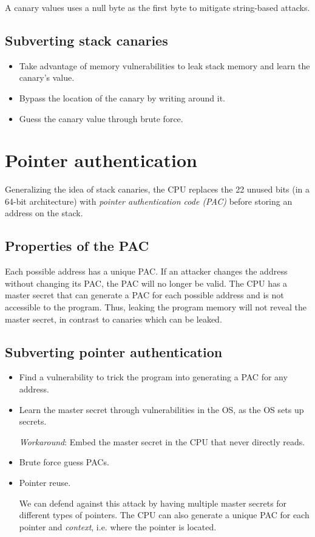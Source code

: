 A canary values uses a null byte as the first byte to mitigate string-based attacks.

\subsection{Subverting stack canaries}
\begin{itemize}
    \item Take advantage of memory vulnerabilities to leak stack memory and learn the canary's value.
    \item Bypass the location of the canary by writing around it.
    \item Guess the canary value through brute force.
\end{itemize}

\section{Pointer authentication}
Generalizing the idea of stack canaries, the CPU replaces the 22 unused bits (in a 64-bit architecture) with \emph{pointer authentication code (PAC)} before storing an address on the stack.

\subsection{Properties of the PAC}
Each possible address has a unique PAC. If an attacker changes the address without changing its PAC, the PAC will no longer be valid. The CPU has a master secret that can generate a PAC for each possible address and is not accessible to the program. Thus, leaking the program memory will not reveal the master secret, in contrast to canaries which can be leaked.

\subsection{Subverting pointer authentication}
\begin{itemize}
    \item Find a vulnerability to trick the program into generating a PAC for any address.
    
    \item Learn the master secret through vulnerabilities in the OS, as the OS sets up secrets.
    
    \emph{Workaround}: Embed the master secret in the CPU that never directly reads.
    
    \item Brute force guess PACs.
    
    \item Pointer reuse. 
    
    We can defend against this attack by having multiple master secrets for different types of pointers. The CPU can also generate a unique PAC for each pointer and \emph{context}, i.e. where the pointer is located.
\end{itemize}

